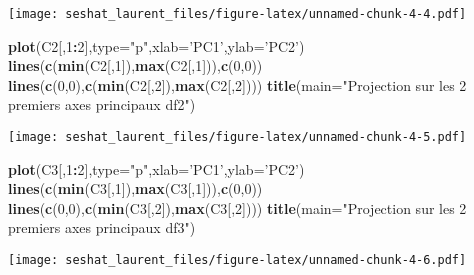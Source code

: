 \documentclass[
]{article}
\newenvironment{Shaded}{\begin{snugshade}}{\end{snugshade}}
\newcommand{\DataTypeTok}[1]{\textcolor[rgb]{0.13,0.29,0.53}{#1}}
\newcommand{\DecValTok}[1]{\textcolor[rgb]{0.00,0.00,0.81}{#1}}
\newcommand{\KeywordTok}[1]{\textcolor[rgb]{0.13,0.29,0.53}{\textbf{#1}}}
\newcommand{\NormalTok}[1]{#1}
\newcommand{\OperatorTok}[1]{\textcolor[rgb]{0.81,0.36,0.00}{\textbf{#1}}}
\newcommand{\StringTok}[1]{\textcolor[rgb]{0.31,0.60,0.02}{#1}}
\begin{document}
\texttt{[image: seshat\_laurent\_files/figure-latex/unnamed-chunk-4-4.pdf]}

\begin{Shaded}
\begin{Highlighting}[]
\KeywordTok{plot}\NormalTok{(C2[,}\DecValTok{1}\OperatorTok{:}\DecValTok{2}\NormalTok{],}\DataTypeTok{type=}\StringTok{"p"}\NormalTok{,}\DataTypeTok{xlab=}\StringTok{'PC1'}\NormalTok{,}\DataTypeTok{ylab=}\StringTok{'PC2'}\NormalTok{)}
\KeywordTok{lines}\NormalTok{(}\KeywordTok{c}\NormalTok{(}\KeywordTok{min}\NormalTok{(C2[,}\DecValTok{1}\NormalTok{]),}\KeywordTok{max}\NormalTok{(C2[,}\DecValTok{1}\NormalTok{])),}\KeywordTok{c}\NormalTok{(}\DecValTok{0}\NormalTok{,}\DecValTok{0}\NormalTok{))}
\KeywordTok{lines}\NormalTok{(}\KeywordTok{c}\NormalTok{(}\DecValTok{0}\NormalTok{,}\DecValTok{0}\NormalTok{),}\KeywordTok{c}\NormalTok{(}\KeywordTok{min}\NormalTok{(C2[,}\DecValTok{2}\NormalTok{]),}\KeywordTok{max}\NormalTok{(C2[,}\DecValTok{2}\NormalTok{])))}
\KeywordTok{title}\NormalTok{(}\DataTypeTok{main=}\StringTok{"Projection sur les 2 premiers axes principaux df2"}\NormalTok{)}
\end{Highlighting}
\end{Shaded}

\texttt{[image: seshat\_laurent\_files/figure-latex/unnamed-chunk-4-5.pdf]}

\begin{Shaded}
\begin{Highlighting}[]
\KeywordTok{plot}\NormalTok{(C3[,}\DecValTok{1}\OperatorTok{:}\DecValTok{2}\NormalTok{],}\DataTypeTok{type=}\StringTok{"p"}\NormalTok{,}\DataTypeTok{xlab=}\StringTok{'PC1'}\NormalTok{,}\DataTypeTok{ylab=}\StringTok{'PC2'}\NormalTok{)}
\KeywordTok{lines}\NormalTok{(}\KeywordTok{c}\NormalTok{(}\KeywordTok{min}\NormalTok{(C3[,}\DecValTok{1}\NormalTok{]),}\KeywordTok{max}\NormalTok{(C3[,}\DecValTok{1}\NormalTok{])),}\KeywordTok{c}\NormalTok{(}\DecValTok{0}\NormalTok{,}\DecValTok{0}\NormalTok{))}
\KeywordTok{lines}\NormalTok{(}\KeywordTok{c}\NormalTok{(}\DecValTok{0}\NormalTok{,}\DecValTok{0}\NormalTok{),}\KeywordTok{c}\NormalTok{(}\KeywordTok{min}\NormalTok{(C3[,}\DecValTok{2}\NormalTok{]),}\KeywordTok{max}\NormalTok{(C3[,}\DecValTok{2}\NormalTok{])))}
\KeywordTok{title}\NormalTok{(}\DataTypeTok{main=}\StringTok{"Projection sur les 2 premiers axes principaux df3"}\NormalTok{)}
\end{Highlighting}
\end{Shaded}

\texttt{[image: seshat\_laurent\_files/figure-latex/unnamed-chunk-4-6.pdf]}
\end{document}
